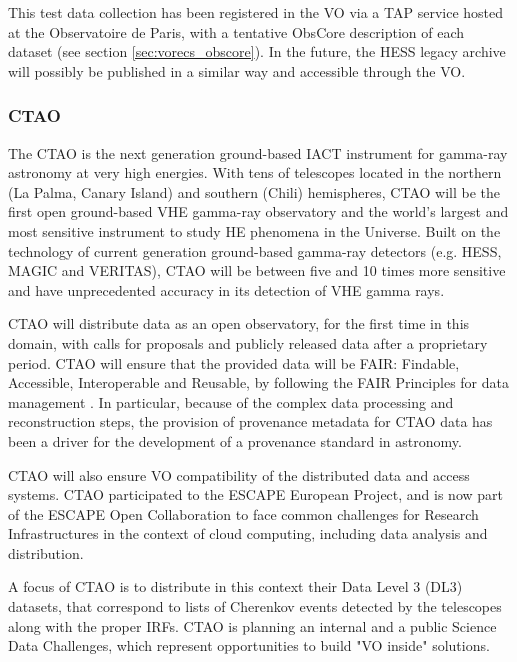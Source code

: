 \documentclass[11pt,a4paper]{ivoa}
\begin{document}
This test data collection has been registered in the \gls{VO} via a \gls{TAP} service hosted at the Observatoire de Paris, with a
tentative ObsCore description of each dataset (see section \ref{sec:vorecs_obscore}). In the future, the \gls{HESS} legacy archive will possibly be published in a similar way and accessible through the \gls{VO}.

\subsubsection{CTAO}
\label{sec:ctao}

The \gls{CTAO} is the next generation ground-based \gls{IACT} instrument for gamma-ray astronomy
at very high energies. With tens of telescopes located in the northern (La Palma, Canary Island)
and southern (Chili) hemispheres, \gls{CTAO} will be the  first open ground-based \gls{VHE} gamma-ray observatory and the world’s
largest and most sensitive instrument to study  \gls{HE} phenomena in the Universe. Built on the technology of current
generation ground-based gamma-ray detectors (e.g. \gls{HESS}, MAGIC and VERITAS), \gls{CTAO} will be between five and 10 times
more sensitive and have unprecedented accuracy  in its detection of \gls{VHE} gamma rays.

\gls{CTAO} will distribute data as an open observatory, for the first time in this domain, with calls for proposals and
publicly released data after a proprietary period. \gls{CTAO} will ensure that the provided data will be FAIR: Findable,
Accessible, Interoperable and Reusable, by following the FAIR Principles for data management \citep{Wilkinson2016}.
In particular, because of the complex data processing and reconstruction steps, the provision of provenance metadata
for \gls{CTAO} data has been a driver for the development of a provenance standard in astronomy.

\gls{CTAO} will also ensure \gls{VO} compatibility of the distributed data and access systems. \gls{CTAO} participated to the ESCAPE
European Project, and is now part of the ESCAPE Open Collaboration to face common challenges for Research Infrastructures
in the context of cloud computing, including data analysis and distribution.

A focus of \gls{CTAO} is to distribute in this context their Data Level 3 (DL3) datasets, that correspond to lists of Cherenkov
events detected by the telescopes along with the proper \gls{IRF}s. \gls{CTAO} is planning an internal and a public Science Data
Challenges, which represent opportunities to build "\gls{VO} inside" solutions.
\end{document}
